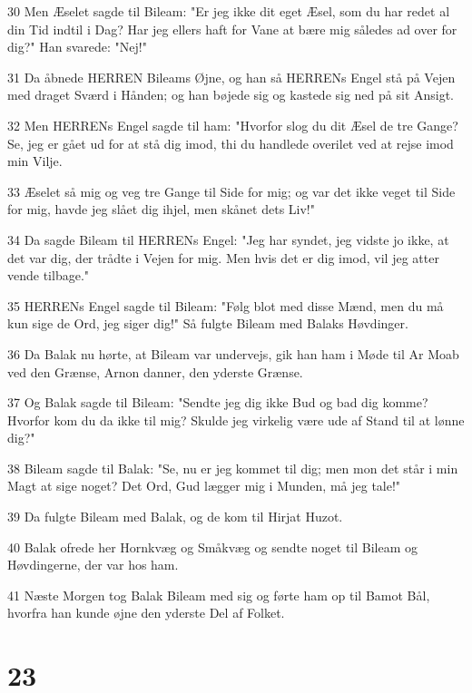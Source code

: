 \par 30 Men Æselet sagde til Bileam: "Er jeg ikke dit eget Æsel, som du har redet al din Tid indtil i Dag? Har jeg ellers haft for Vane at bære mig således ad over for dig?" Han svarede: "Nej!"
\par 31 Da åbnede HERREN Bileams Øjne, og han så HERRENs Engel stå på Vejen med draget Sværd i Hånden; og han bøjede sig og kastede sig ned på sit Ansigt.
\par 32 Men HERRENs Engel sagde til ham: "Hvorfor slog du dit Æsel de tre Gange? Se, jeg er gået ud for at stå dig imod, thi du handlede overilet ved at rejse imod min Vilje.
\par 33 Æselet så mig og veg tre Gange til Side for mig; og var det ikke veget til Side for mig, havde jeg slået dig ihjel, men skånet dets Liv!"
\par 34 Da sagde Bileam til HERRENs Engel: "Jeg har syndet, jeg vidste jo ikke, at det var dig, der trådte i Vejen for mig. Men hvis det er dig imod, vil jeg atter vende tilbage."
\par 35 HERRENs Engel sagde til Bileam: "Følg blot med disse Mænd, men du må kun sige de Ord, jeg siger dig!" Så fulgte Bileam med Balaks Høvdinger.
\par 36 Da Balak nu hørte, at Bileam var undervejs, gik han ham i Møde til Ar Moab ved den Grænse, Arnon danner, den yderste Grænse.
\par 37 Og Balak sagde til Bileam: "Sendte jeg dig ikke Bud og bad dig komme? Hvorfor kom du da ikke til mig? Skulde jeg virkelig være ude af Stand til at lønne dig?"
\par 38 Bileam sagde til Balak: "Se, nu er jeg kommet til dig; men mon det står i min Magt at sige noget? Det Ord, Gud lægger mig i Munden, må jeg tale!"
\par 39 Da fulgte Bileam med Balak, og de kom til Hirjat Huzot.
\par 40 Balak ofrede her Hornkvæg og Småkvæg og sendte noget til Bileam og Høvdingerne, der var hos ham.
\par 41 Næste Morgen tog Balak Bileam med sig og førte ham op til Bamot Bål, hvorfra han kunde øjne den yderste Del af Folket.

\chapter{23}

